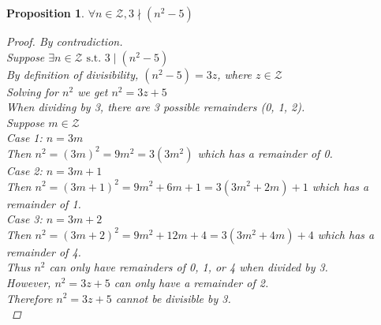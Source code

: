 \documentclass{article}
\newtheorem*{theorem}{Proposition}
\begin{document}
\pagebreak

\begin{theorem}
    \(\forall n \in \mathcal{Z}, 3 \nmid (n^2 - 5)\)
    \begin{proof}
        By contradiction. \\
        Suppose \(\exists n \in \mathcal{Z} \text{ s.t. } 3 \mid (n^2 - 5)\) \\
        By definition of divisibility, \((n^2 - 5) = 3z\), where \(z \in \mathcal{Z}\) \\
        Solving for \(n^2\) we get \(n^2 = 3z + 5\) \\
        When dividing by 3, there are 3 possible remainders (0, 1, 2). \\
        Suppose \(m \in \mathcal{Z}\) \\
        Case 1: \(n = 3m\) \\
        \indent
        Then \(n^2 = (3m)^2 = 9m^2 = 3(3m^2)\) which has a remainder of 0. \\
        Case 2: \(n = 3m + 1\) \\
        \indent
        Then \(n^2 = (3m + 1)^2 = 9m^2 + 6m + 1 = 3(3m^2 + 2m) + 1\) which has a remainder of 1. \\
        Case 3: \(n = 3m + 2\) \\
        Then \(n^2 = (3m + 2)^2 = 9m^2 + 12m + 4 = 3(3m^2 + 4m) + 4\) which has a remainder of 4. \\
        Thus \(n^2\) can only have remainders of 0, 1, or 4 when divided by 3. \\
        However, \(n^2 = 3z + 5\) can only have a remainder of 2. \\
        Therefore \(n^2 = 3z + 5\) cannot be divisible by 3. \\
    \end{proof}
\end{theorem}
\end{document}

